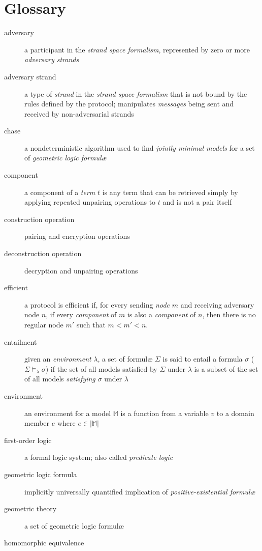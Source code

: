 \section{Glossary}
	\begin{description}
		\item[adversary]
			a participant in the \emph{strand space formalism}, represented by
			zero or more \emph{adversary strands}
		\item[adversary strand]
			a type of \emph{strand} in the \emph{strand space formalism} that
			is not bound by the rules defined by the protocol; manipulates
			\emph{messages} being sent and received by non-adversarial strands
		\item[chase]
			a nondeterministic algorithm used to find \emph{jointly minimal
			models} for a set of \emph{geometric logic formul{\ae}}
		\item[component]
			a component of a \emph{term} $t$ is any term that can be retrieved
			simply by applying repeated unpairing operations to $t$ and is not
			a pair itself
		\item[construction operation]
			pairing and encryption operations
		\item[deconstruction operation]
			decryption and unpairing operations
		\item[efficient]
			a protocol is efficient if, for every sending \emph{node} $m$ and
			receiving adversary node $n$, if every \emph{component} of $m$ is
			also a \emph{component} of $n$, then there is no regular node $m'$
			such that $m < m' < n$.
		\item[entailment]
			given an \emph{environment} $\lambda$, a set of formul{\ae}
			$\Sigma$ is said to entail a formula $\sigma$ ($\Sigma
			\models_\lambda \sigma$) if the set of all models satisfied
			by $\Sigma$ under $\lambda$ is a subset of the set of all models
			\emph{satisfying} $\sigma$ under $\lambda$
		\item[environment]
			an environment for a model $\mathbb{M}$ is a function from a
			variable $v$ to a domain member $e$ where $e \in |\mathbb{M}|$
		\item[first-order logic]
			a formal logic system; also called \emph{predicate logic}
		\item[geometric logic formula]
			implicitly universally quantified implication of
			\emph{positive-existential formul{\ae}}
		\item[geometric theory]
			a set of geometric logic formul{\ae}
		\item[homomorphic equivalence]

\end{description}
